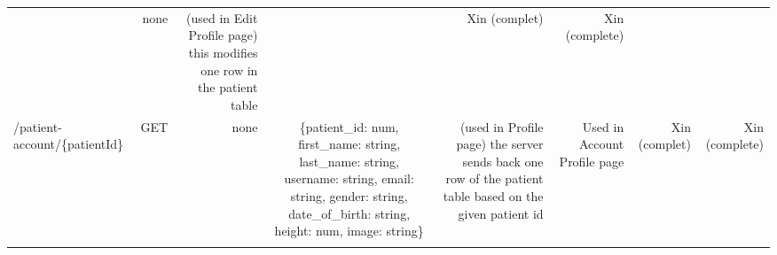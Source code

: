 \documentclass[]{book}
\begin{document}
\begin{longtable}[]{@{}lrrcrrrr@{}}
\begin{minipage}[t]{0.14\columnwidth}
\end{minipage} & \begin{minipage}[t]{0.15\columnwidth}\centering
none\strut
\end{minipage} & \begin{minipage}[t]{0.06\columnwidth}\raggedleft
(used in Edit Profile page) this modifies one row in the patient table\strut
\end{minipage} & \begin{minipage}[t]{0.06\columnwidth}\raggedleft
\strut
\end{minipage} & \begin{minipage}[t]{0.06\columnwidth}\raggedleft
Xin (complet)\strut
\end{minipage} & \begin{minipage}[t]{0.06\columnwidth}\raggedleft
Xin (complete)\strut
\end{minipage}\tabularnewline
\begin{minipage}[t]{0.13\columnwidth}\raggedright
/patient-account/\{patientId\}\strut
\end{minipage} & \begin{minipage}[t]{0.14\columnwidth}\raggedleft
GET\strut
\end{minipage} & \begin{minipage}[t]{0.14\columnwidth}\raggedleft
none\strut
\end{minipage} & \begin{minipage}[t]{0.15\columnwidth}\centering
\{patient\_id: num, first\_name: string, last\_name: string, username: string, email: string, gender: string, date\_of\_birth: string, height: num, image: string\}\strut
\end{minipage} & \begin{minipage}[t]{0.06\columnwidth}\raggedleft
(used in Profile page) the server sends back one row of the patient table based on the given patient id\strut
\end{minipage} & \begin{minipage}[t]{0.06\columnwidth}\raggedleft
Used in Account Profile page\strut
\end{minipage} & \begin{minipage}[t]{0.06\columnwidth}\raggedleft
Xin (complet)\strut
\end{minipage} & \begin{minipage}[t]{0.06\columnwidth}\raggedleft
Xin (complete)\strut
\end{minipage}\tabularnewline
\begin{minipage}[t]{0.13\columnwidth}\raggedright

\end{minipage}
\end{longtable}
\end{document}
